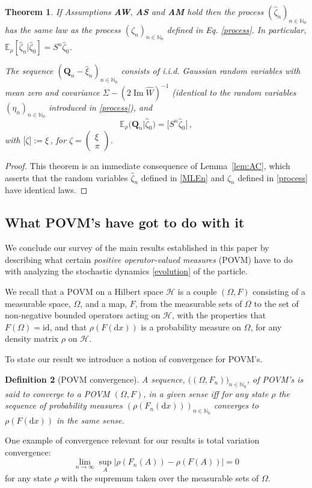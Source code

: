 \documentclass[12pt]{article}
\newtheorem{theorem}{Theorem}[section]
\newtheorem{definition}[theorem]{Definition}
\renewcommand{\Im}{\operatorname{Im}}
\renewcommand{\d}{{\mathrm d}}
\newcommand{\id}{\mathrm{id}}
\begin{document}
\begin{theorem}
	\label{thm:AR}
	If Assumptions {\bf{AW}}, {\bf{AS}} and {\bf{AM}} hold
	then the process $(\widehat{\zeta}_n)_{n\in \mathbb N_0}$ has the same law as the process $(\zeta_n)_{n\in\mathbb N_0}$ defined in Eq. \eqref{process}. In particular, $\mathbb{E}_\rho[\widehat{\zeta}_n| \widehat{\zeta}_0] = 
	S^n \widehat{\zeta}_0$.
	
	The sequence $(\mathbf Q_n-\widehat{\xi}_n)_{n\in\mathbb N_0}$ consists of i.i.d. Gaussian random variables with mean zero and covariance $\Sigma-(2\Im\widehat W)^{-1}$ (identical to the random variables 
	$(\eta_n)_{n\in \mathbb{N}_0}$ introduced in \eqref{process}), and
	$$
	\mathbb{E}_\rho \big(\mathbf Q_n  | \widehat{\zeta}_0\big) =  \big[S^n \widehat{\zeta}_0\big]\,,
	$$
	with $\big[\zeta\big] := \xi$\,, for $\zeta=\begin{pmatrix} \xi\\ \pi \end{pmatrix}$.
\end{theorem}
\begin{proof}
	This theorem is an immediate consequence of Lemma~\ref{lem:AC}, which asserts that the random variables 
	$\widehat{\zeta}_n$ defined in \eqref{MLEn} and ${\zeta}_n$ defined in \eqref{process} have identical laws. 	\end{proof}
\subsection{What POVM's have got to do with it}\label{povm}
We conclude our survey of the main results established in this paper by describing what certain \textit{positive operator-valued measures} (POVM) have to do with analyzing the stochastic dynamics \eqref{evolution} of the particle.

We recall that a POVM on a Hilbert space $\mathcal{H}$ is a couple $(\Omega,F)$ consisting 
of a measurable space, $\Omega$, and a map, $F$, from the measurable sets of $\Omega$ to the set of 
non-negative bounded operators acting on $\mathcal{H}$, with the properties that $F(\Omega)=\id$,
and that $\rho(F(\d x))$ is a probability measure on $\Omega$, for any density matrix $\rho$ on 
$\mathcal{H}$.

To state our result we introduce a notion of convergence for POVM's.

\begin{definition}[POVM convergence]
A sequence, $\big((\Omega,F_n)\big)_{n\in \mathbb{N}_0}$, of POVM's is said to converge to a POVM 
$(\Omega,F)$, in a given sense iff for any state $\rho$ the sequence of probability measures $(\rho(F_n(\d x)))_{n\in\mathbb N_0}$ converges to $\rho(F(\d x))$ in the same sense.
\end{definition}
One example of convergence relevant for our results is total variation convergence:
$$\lim_{n\to\infty}\sup_{A}|\rho(F_n(A))-\rho(F(A))|=0$$
for any state $\rho$ with the supremum taken over the measurable sets of $\Omega$.
\end{document}
